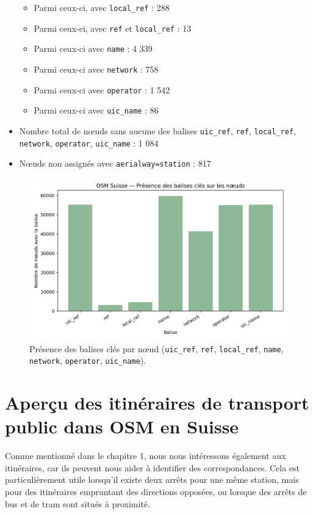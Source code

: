 \begin{itemize}
\begin{itemize}
        \item Parmi ceux-ci, avec \texttt{local\_ref} : 288
        \item Parmi ceux-ci, avec \texttt{ref} et \texttt{local\_ref} : 13
        \item Parmi ceux-ci avec \texttt{name} : 4 339
        \item Parmi ceux-ci avec \texttt{network} : 758
        \item Parmi ceux-ci avec \texttt{operator} : 1 542
        \item Parmi ceux-ci avec \texttt{uic\_name} : 86
    \end{itemize}
    \item Nombre total de nœuds sans aucune des balises \texttt{uic\_ref}, \texttt{ref}, \texttt{local\_ref}, \texttt{network}, \texttt{operator}, \texttt{uic\_name} : 1 084
    \item Nœuds non assignés avec \texttt{aerialway=station} : 817
\end{itemize}

\begin{figure}[H]
  \centering
  \includegraphics[width=.8\linewidth]{figures/plots/osm_tag_presence.png}
  \caption[Présence des balises clés]{Présence des balises clés par nœud (\texttt{uic\_ref}, \texttt{ref}, \texttt{local\_ref}, \texttt{name}, \texttt{network}, \texttt{operator}, \texttt{uic\_name}).}
  \label{fig:osm_tag_presence_inline}
\end{figure}

\section{Aperçu des itinéraires de transport public dans OSM en Suisse}

Comme mentionné dans le chapitre 1, nous nous intéressons également aux itinéraires, car ils peuvent nous aider à identifier des correspondances. Cela est particulièrement utile lorsqu'il existe deux arrêts pour une même station, mais pour des itinéraires empruntant des directions opposées, ou lorsque des arrêts de bus et de tram sont situés à proximité.

